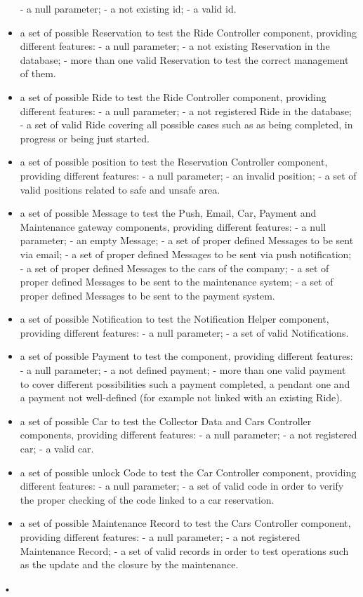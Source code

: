 \documentclass[10pt, a4paper,titlepage]{article}
\begin{document}
\begin{itemize}
\subitem - a null parameter;
\subitem - a not existing id;
\subitem - a valid id.
\item a set of possible Reservation to test the Ride Controller component, providing different features:
\subitem - a null parameter;
\subitem - a not existing Reservation in the database;
\subitem - more than one valid Reservation to test the correct management of them.
\item a set of possible Ride to test the Ride Controller component, providing different features:
\subitem - a null parameter;
\subitem - a not registered Ride in the database;
\subitem - a set of valid Ride covering all possible cases such as as being completed, in progress or being just started.
\item a set of possible position to test the Reservation Controller component, providing different features:
\subitem - a null parameter;
\subitem - an invalid position;
\subitem - a set of valid positions related to safe and unsafe area.
\item a set of possible Message to test the Push, Email, Car, Payment and Maintenance gateway components, providing different features:
\subitem - a null parameter;
\subitem - an empty Message;
\subitem - a set of proper defined Messages to be sent via email;
\subitem - a set of proper defined Messages to be sent via push notification;
\subitem - a set of proper defined Messages to the cars of the company;
\subitem - a set of proper defined Messages to be sent to the maintenance system;
\subitem - a set of proper defined Messages to be sent to the payment system.
\item a set of possible Notification to test the Notification Helper component, providing different features:
\subitem - a null parameter;
\subitem - a set of valid Notifications.
\item a set of possible Payment to test the  component, providing different features:
\subitem - a null parameter;
\subitem - a not defined payment;
\subitem - more than one valid payment to cover different possibilities such a payment completed, a pendant one and a payment not well-defined (for example not linked with an existing Ride).
\item a set of possible Car to test the Collector Data and Cars Controller components, providing different features:
\subitem - a null parameter;
\subitem - a not registered car;
\subitem - a valid car.
\item a set of possible unlock Code to test the Car Controller component, providing different features:
\subitem - a null parameter;
\subitem - a set of valid code in order to verify the proper checking of the code linked to a car reservation.
\item a set of possible Maintenance Record to test the Cars Controller component, providing different features:
\subitem - a null parameter;
\subitem - a not registered Maintenance Record;
\subitem - a set of valid records in order to test operations such as the update and the closure by the maintenance.
\end{itemize}•
\end{document}
